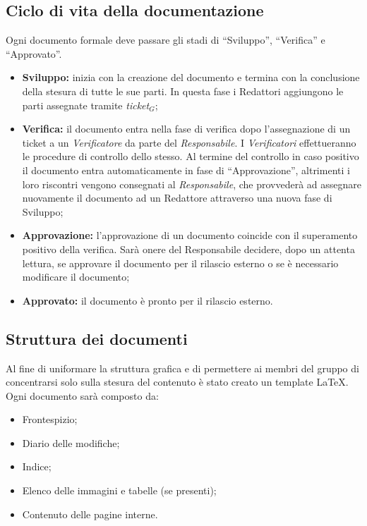 \subsection{Ciclo di vita della documentazione}
Ogni documento formale deve passare gli stadi di ``Sviluppo”, ``Verifica” e ``Approvato”.
\begin{itemize}
	\item \textbf{Sviluppo:} inizia con la creazione del documento e termina con la conclusione	della stesura di tutte le sue parti. In questa fase i Redattori aggiungono le parti assegnate tramite \textit{ticket$_{G}$};
	
	\item  \textbf{Verifica:} il documento entra nella fase di verifica dopo l’assegnazione di un ticket a un \textit{Verificatore} da
	parte del \textit{Responsabile}. I \textit{Verificatori} effettueranno le procedure di controllo
	dello stesso.
	Al termine del controllo in caso positivo il documento entra automaticamente
	in fase di ``Approvazione”, altrimenti i loro riscontri vengono consegnati
	al \textit{Responsabile}, che provvederà ad assegnare nuovamente il
	documento ad un Redattore attraverso una nuova fase di Sviluppo;
	
	\item  \textbf{Approvazione:} l’approvazione di un documento coincide con il superamento
	positivo della verifica.
	Sarà onere del Responsabile decidere, dopo un attenta lettura, se approvare il documento per il rilascio esterno o se è necessario modificare il documento;

	
	\item  \textbf{Approvato:} il documento è pronto per il rilascio esterno.
\end{itemize}


\subsection{Struttura dei documenti}
Al fine di uniformare la struttura grafica e di permettere ai membri del gruppo di concentrarsi solo sulla stesura del contenuto è stato creato un template \LaTeX.
Ogni documento sarà composto da:
\begin{itemize}
	\item Frontespizio;
	\item Diario delle modifiche;
	\item Indice;
	\item Elenco delle immagini e tabelle (se presenti);
	\item Contenuto delle pagine interne.
\end{itemize}
